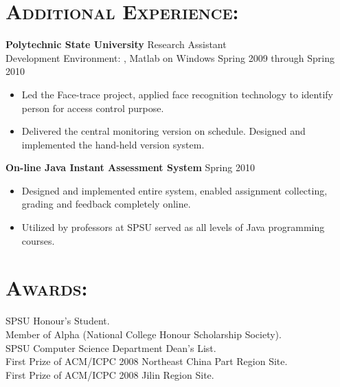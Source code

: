 \begin{resume}
\section{\textsc{Additional Experience:}}
\textbf{Polytechnic State University} \hfill Research Assistant\\
Development Environment: \CSharp, Matlab on Windows \hfill Spring 2009 through Spring 2010 
\begin{itemize}
 	\item Led the Face-trace project, applied face recognition technology to identify person for access control purpose.
	\item Delivered the central monitoring version on schedule. Designed and implemented the hand-held version system.    
\end{itemize}

\textbf{On-line Java Instant Assessment System} \hfill Spring 2010
\begin{itemize}
	\item Designed and implemented entire system, enabled assignment collecting, grading and feedback completely online.
	\item Utilized by professors at SPSU served as all levels of Java programming courses.
\end{itemize}



\section{\textsc{Awards:}} 
SPSU Honour’s Student. \\
Member of Alpha (National College Honour Scholarship Society).  \\
SPSU Computer Science Department Dean's List.\\
First Prize of ACM/ICPC 2008 Northeast China Part Region Site.	\\
First Prize of ACM/ICPC 2008 Jilin Region Site. 





\end{resume}

